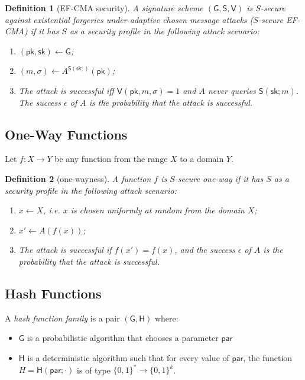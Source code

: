 \documentclass{article}
\newtheorem{definition}{Definition}[section]
\newcommand{\bits}[1]{{\{0,1\}^{#1}}}
\newcommand{\keygen}[0]{\mathsf{G}}
\newcommand{\sig}[0]{\mathsf{S}}
\newcommand{\sigver}[0]{\mathsf{V}}
\newcommand{\pubkey}[0]{\mathsf{pk}}
\newcommand{\prikey}[0]{\mathsf{sk}}
\newcommand{\hfgen}[0]{\mathsf{G}} %
\newcommand{\hfunc}[0]{\mathsf{H}} %
\newcommand{\param}[0]{\mathsf{par}}
\begin{document}
\begin{definition}[EF-CMA security]
A signature scheme $(\keygen, \sig, \sigver)$ is $S$-secure against existential forgeries under adaptive chosen message attacks ($S$-secure EF-CMA) if it has $S$ as a security profile in the following attack scenario:
\begin{enumerate}
\item $(\pubkey, \prikey) \gets \keygen$;
\item $(m,\sigma)\gets A^{\mathsf{S}(\prikey;)}(\pubkey)$;
\item The attack is successful iff $\mathsf{V}(\pubkey, m, \sigma)=1$
and $A$ never queries $\mathsf{S}(\prikey;m)$.
The success $\epsilon$ of $A$ is the probability that the attack is successful.
\end{enumerate}
\end{definition}

\subsection{One-Way Functions}

Let $f\colon X \rightarrow Y$ be any function from the range $X$ to a domain $Y$.

\begin{definition}[one-wayness]
A function $f$ is $S$-secure one-way if it has $S$ as a security profile in the following attack scenario:
\begin{enumerate}
\item $x\gets X$, i.e. $x$ is chosen uniformly at random from the domain $X$;
\item $x'\gets A(f(x))$;
\item The attack is successful if $f(x')=f(x)$,
and the success $\epsilon$ of $A$ is the probability that the attack is successful.
\end{enumerate}
\end{definition}

\subsection{Hash Functions}

\noindent A \emph{hash function family} is a pair $(\hfgen,\hfunc)$ where:
\begin{itemize}
\item $\hfgen$ is a probabilistic algorithm that chooses a parameter $\param$
\item $\hfunc$ is a deterministic algorithm such that for every value of $\param$, the function $H=\hfunc(\param; \cdot)$ is of type $\bits{\ast} \to \bits{k}$.
\end{itemize}
\end{document}
